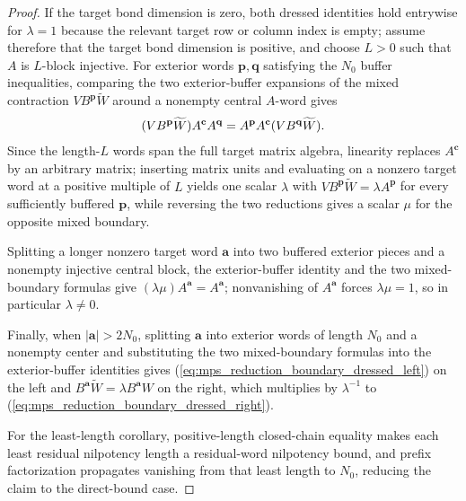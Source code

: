 \begin{proof}
    \leanok
    If the target bond dimension is zero, both dressed identities hold
    entrywise for $\lambda=1$ because the relevant target row or column index is
    empty; assume therefore that the target bond dimension is positive, and
    choose $L>0$ such that $A$ is $L$-block injective.  For exterior words
    $\mathbf p,\mathbf q$ satisfying the $N_0$ buffer inequalities, comparing
    the two exterior-buffer expansions of the mixed contraction
    $VB^{\mathbf p}\widetilde W$ around a nonempty central $A$-word gives
    \begin{align}
        (VB^{\mathbf p}\widetilde W)A^{\mathbf c}A^{\mathbf q}
        =A^{\mathbf p}A^{\mathbf c}(VB^{\mathbf q}\widetilde W).
        \notag
    \end{align}
    Since the length-$L$ words span the full target matrix algebra, linearity
    replaces $A^{\mathbf c}$ by an arbitrary matrix; inserting matrix units
    and evaluating on a nonzero target word at a positive multiple of $L$
    yields one scalar $\lambda$ with
    $VB^{\mathbf p}\widetilde W=\lambda A^{\mathbf p}$ for every sufficiently
    buffered $\mathbf p$, while reversing the two reductions gives a scalar
    $\mu$ for the opposite mixed boundary.

    Splitting a longer nonzero target word $\mathbf a$ into two buffered
    exterior pieces and a nonempty injective central block, the exterior-buffer
    identity and the two mixed-boundary formulas give
    $(\lambda\mu)A^{\mathbf a}=A^{\mathbf a}$; nonvanishing of $A^{\mathbf a}$
    forces $\lambda\mu=1$, so in particular $\lambda\ne0$.

    Finally, when $|\mathbf a|>2N_0$, splitting $\mathbf a$ into exterior words
    of length $N_0$ and a nonempty center and substituting the two
    mixed-boundary formulas into the exterior-buffer identities gives
    (\ref{eq:mps_reduction_boundary_dressed_left}) on the left and
    $B^{\mathbf a}\widetilde W=\lambda B^{\mathbf a}W$ on the right, which
    multiplies by $\lambda^{-1}$ to
    (\ref{eq:mps_reduction_boundary_dressed_right}).

    For the least-length corollary, positive-length closed-chain equality makes
    each least residual nilpotency length a residual-word nilpotency bound, and
    prefix factorization propagates vanishing from that least length to $N_0$,
    reducing the claim to the direct-bound case.
\end{proof}
